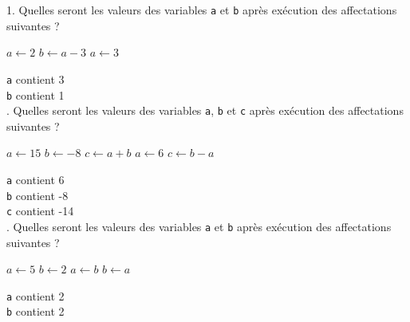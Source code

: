 \newpage
\begin{cor}
\begin{multicols}{3}
1. Quelles seront les valeurs des variables \texttt{a} et  \texttt{b} après exécution des affectations suivantes ?\\
\begin{algorithm}[H]
$a \leftarrow 2$ \;
$b \leftarrow a-3$ \;
$a \leftarrow 3$ \;
\end{algorithm}
\noindent\texttt{a} contient 3 \\
\texttt{b} contient 1\\

. Quelles seront les valeurs des variables \texttt{a}, \texttt{b} et \texttt{c} après exécution des affectations suivantes ?\\
\begin{algorithm}[H]
$a \leftarrow 15$ \;
$b \leftarrow -8$ \;
$c \leftarrow a+b$ \;
$a \leftarrow 6$ \;
$c \leftarrow b-a$ \;
\end{algorithm}
\noindent\texttt{a} contient 6 \\
\texttt{b} contient -8 \\
\texttt{c} contient -14\\

. Quelles seront les valeurs des variables \texttt{a} et  \texttt{b} après exécution des affectations suivantes ?\\
\begin{algorithm}[H]
$a \leftarrow 5$ \;
$b \leftarrow 2$ \;
$a \leftarrow b$ \;
$b \leftarrow a$ \;
\end{algorithm}
\noindent\texttt{a} contient 2 \\
\texttt{b} contient 2\\
\end{multicols}
\end{cor}




